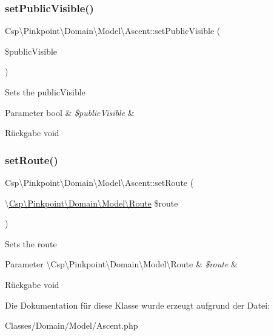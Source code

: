 \subsubsection{\texorpdfstring{set\+Public\+Visible()}{setPublicVisible()}}
{\footnotesize\ttfamily Csp\textbackslash{}\+Pinkpoint\textbackslash{}\+Domain\textbackslash{}\+Model\textbackslash{}\+Ascent\+::set\+Public\+Visible (\begin{DoxyParamCaption}\item[{}]{\$public\+Visible }\end{DoxyParamCaption})}

Sets the public\+Visible


\begin{DoxyParams}[1]{Parameter}
bool & {\em \$public\+Visible} & \\
\hline
\end{DoxyParams}
\begin{DoxyReturn}{Rückgabe}
void 
\end{DoxyReturn}
\mbox{\label{classCsp_1_1Pinkpoint_1_1Domain_1_1Model_1_1Ascent_ab97d865275a2eb1181a8c02aaa719335}} 
\subsubsection{\texorpdfstring{set\+Route()}{setRoute()}}
{\footnotesize\ttfamily Csp\textbackslash{}\+Pinkpoint\textbackslash{}\+Domain\textbackslash{}\+Model\textbackslash{}\+Ascent\+::set\+Route (\begin{DoxyParamCaption}\item[{\textbackslash{}\hyperlink{classCsp_1_1Pinkpoint_1_1Domain_1_1Model_1_1Route}{Csp\textbackslash{}\+Pinkpoint\textbackslash{}\+Domain\textbackslash{}\+Model\textbackslash{}\+Route}}]{\$route }\end{DoxyParamCaption})}

Sets the route


\begin{DoxyParams}[1]{Parameter}
\textbackslash{}\+Csp\textbackslash{}\+Pinkpoint\textbackslash{}\+Domain\textbackslash{}\+Model\textbackslash{}\+Route & {\em \$route} & \\
\hline
\end{DoxyParams}
\begin{DoxyReturn}{Rückgabe}
void 
\end{DoxyReturn}


Die Dokumentation für diese Klasse wurde erzeugt aufgrund der Datei\+:\begin{DoxyCompactItemize}
\item 
Classes/\+Domain/\+Model/Ascent.\+php\end{DoxyCompactItemize}
